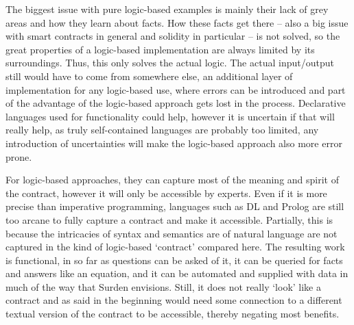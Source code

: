 \documentclass[conference]{IEEEtran}
\begin{document}
The biggest issue with pure logic-based examples is mainly their lack of grey areas and how they learn about facts. %
How these facts get there – also a big issue with smart contracts in general and solidity in particular  – is not solved, so the great properties of a logic-based implementation are always limited by its surroundings. 
Thus, this only solves the actual logic. The actual input/output still would have to come from somewhere else, an
additional layer of implementation for any logic-based use, where errors can be introduced and part of the advantage of the logic-based approach gets lost in the process. %
Declarative languages used for functionality could help, however it is uncertain if that will really help, as truly self-contained languages are probably too limited, any introduction of uncertainties will make the logic-based approach also more error prone.



For logic-based approaches, they can capture most of the meaning and spirit of the contract, however it will only be accessible by experts. Even if it is more precise than imperative programming, languages such as DL and Prolog are still too arcane to fully capture a contract and make it accessible. Partially, this is because the intricacies of syntax and semantics are of natural language are not captured in the kind of logic-based ‘contract’ compared here. The resulting work is functional, in so far as questions can be asked of it, it can be queried for facts and answers like an equation, and it can be automated and supplied with data in much of the way that Surden envisions. Still, it does not really ‘look’ like a contract and as said in the beginning would need some connection to a different textual version of the contract to be accessible, %
thereby negating most benefits.
\end{document}
